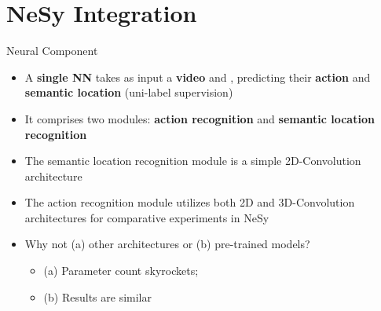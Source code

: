 \documentclass[10pt, aspectratio=169]{beamer}
\begin{document}
\section{NeSy Integration}
{
    \begin{frame}
        \sectionpage%
    \end{frame}
}


\begin{frame}{Neural Component}
    \begin{itemize}
        \setlength{\itemsep}{10pt}
        \item A \textbf{single NN} takes as input a \textbf{video} and  , predicting their \textbf{action} and \textbf{semantic location} (uni-label supervision)
        \item It comprises two modules: \textbf{action recognition} and \textbf{semantic location recognition}
        \item The semantic location recognition module is a simple \textcolor{umBlueLighter}{2D-Convolution} architecture
        \item The action recognition module utilizes both \textcolor{umBlueLighter}{2D} and \textcolor{umBlueLighter}{3D-Convolution} architectures for comparative experiments in NeSy
        \item Why not (a) other architectures or (b) pre-trained models?  
    \vspace{5pt}
    \begin{itemize}
        \setlength{\itemsep}{3pt}
        \item (a) Parameter count skyrockets;
        \item (b) Results are similar
    \end{itemize}
    \end{itemize}
\end{frame}
\end{document}
